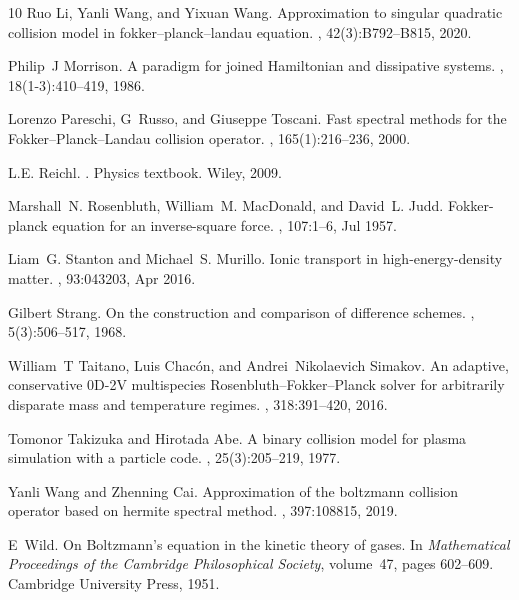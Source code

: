 \documentclass[preprint,1p,times]{elsarticle}
\theoremstyle{definition}
\theoremstyle{remark}
\begin{document}
\begin{thebibliography}{10}
Ruo Li, Yanli Wang, and Yixuan Wang.
\newblock Approximation to singular quadratic collision model in
  fokker--planck--landau equation.
, 42(3):B792--B815, 2020.

Philip~J Morrison.
\newblock A paradigm for joined {H}amiltonian and dissipative systems.
, 18(1-3):410--419, 1986.

Lorenzo Pareschi, G~Russo, and Giuseppe Toscani.
\newblock Fast spectral methods for the {F}okker--{P}lanck--{L}andau collision
  operator.
, 165(1):216--236, 2000.

L.E. Reichl.
.
\newblock Physics textbook. Wiley, 2009.

Marshall~N. Rosenbluth, William~M. MacDonald, and David~L. Judd.
\newblock Fokker-planck equation for an inverse-square force.
, 107:1--6, Jul 1957.

Liam~G. Stanton and Michael~S. Murillo.
\newblock Ionic transport in high-energy-density matter.
, 93:043203, Apr 2016.

Gilbert Strang.
\newblock On the construction and comparison of difference schemes.
, 5(3):506--517, 1968.

William~T Taitano, Luis Chac{\'o}n, and Andrei~Nikolaevich Simakov.
\newblock An adaptive, conservative 0{D}-2{V} multispecies
  {R}osenbluth--{F}okker--{P}lanck solver for arbitrarily disparate mass and
  temperature regimes.
, 318:391--420, 2016.

Tomonor Takizuka and Hirotada Abe.
\newblock A binary collision model for plasma simulation with a particle code.
, 25(3):205--219, 1977.

Yanli Wang and Zhenning Cai.
\newblock Approximation of the boltzmann collision operator based on hermite
  spectral method.
, 397:108815, 2019.

E~Wild.
\newblock On {B}oltzmann's equation in the kinetic theory of gases.
\newblock In {\em Mathematical Proceedings of the Cambridge Philosophical
  Society}, volume~47, pages 602--609. Cambridge University Press, 1951.


\end{thebibliography}
\end{document}
